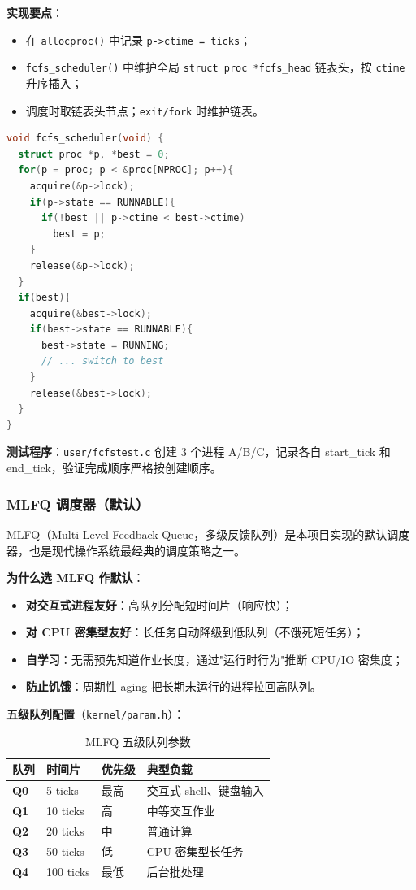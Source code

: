 \documentclass[12pt,a4paper]{ctexart}
\begin{document}
\textbf{实现要点}：
\begin{itemize}
  \item 在 \texttt{allocproc()} 中记录 \texttt{p->ctime = ticks}；
  \item \texttt{fcfs\_scheduler()} 中维护全局 \texttt{struct proc *fcfs\_head} 链表头，按 \texttt{ctime} 升序插入；
  \item 调度时取链表头节点；\texttt{exit/fork} 时维护链表。
\end{itemize}

\begin{lstlisting}[language=C, caption={FCFS 选进程（核心）}]
void fcfs_scheduler(void) {
  struct proc *p, *best = 0;
  for(p = proc; p < &proc[NPROC]; p++){
    acquire(&p->lock);
    if(p->state == RUNNABLE){
      if(!best || p->ctime < best->ctime)
        best = p;
    }
    release(&p->lock);
  }
  if(best){
    acquire(&best->lock);
    if(best->state == RUNNABLE){
      best->state = RUNNING;
      // ... switch to best
    }
    release(&best->lock);
  }
}
\end{lstlisting}

\textbf{测试程序}：\texttt{user/fcfstest.c} 创建 3 个进程 A/B/C，记录各自 start\_tick 和 end\_tick，验证完成顺序严格按创建顺序。

\subsubsection{MLFQ 调度器（默认）}

MLFQ（Multi-Level Feedback Queue，多级反馈队列）是本项目实现的默认调度器，也是现代操作系统最经典的调度策略之一。

\textbf{为什么选 MLFQ 作默认}：
\begin{itemize}
  \item \textbf{对交互式进程友好}：高队列分配短时间片（响应快）；
  \item \textbf{对 CPU 密集型友好}：长任务自动降级到低队列（不饿死短任务）；
  \item \textbf{自学习}：无需预先知道作业长度，通过"运行时行为"推断 CPU/IO 密集度；
  \item \textbf{防止饥饿}：周期性 aging 把长期未运行的进程拉回高队列。
\end{itemize}

\textbf{五级队列配置}（\texttt{kernel/param.h}）：

\begin{table}[H]
\centering
\caption{MLFQ 五级队列参数}
\begin{tabular}{>{\bfseries}p{2cm}p{2.5cm}p{2.5cm}p{6cm}}
\toprule
\textbf{队列} & \textbf{时间片} & \textbf{优先级} & \textbf{典型负载} \\
\midrule
Q0 & 5 ticks  & 最高  & 交互式 shell、键盘输入 \\
Q1 & 10 ticks & 高    & 中等交互作业 \\
Q2 & 20 ticks & 中    & 普通计算 \\
Q3 & 50 ticks & 低    & CPU 密集型长任务 \\
Q4 & 100 ticks & 最低 & 后台批处理 \\
\bottomrule
\end{tabular}
\end{table}
\end{document}
